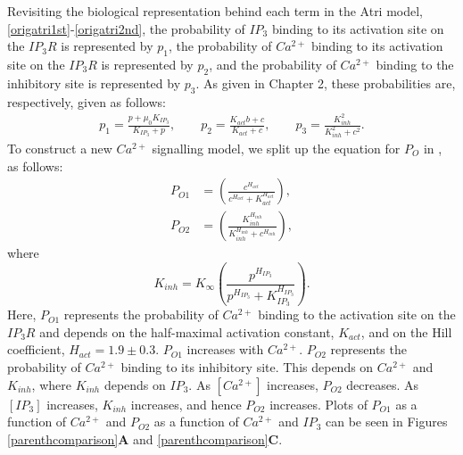 Revisiting the biological representation behind each term in the Atri model, \eqref{origatri1st}-\eqref{origatri2nd}, the probability of $IP_3$ binding to its activation site on the $IP_3R$ is represented by $p_1$, the probability of $Ca^{2+}$ binding to its activation site on the $IP_3R$ is represented by $p_2$, and the probability of $Ca^{2+}$ binding to the inhibitory site is represented by $p_3$. As given in Chapter 2, these probabilities are, respectively, given as follows:
\begin{align}
    p_1=\frac{p+\mu_0K_{IP_3}}{K_{IP_3}+p}, \qquad p_2=\frac{K_{act}b+c}{K_{act}+c}, \qquad p_3=\frac{K_{inh}^2}{K_{inh}^2+c^2}.\nonumber
\end{align}
To construct a new $Ca^{2+}$ signalling model, we split up the equation for $P_O$ in , as follows:
\begin{align}
    P_{O1}&={\left(\frac{c^{H_{act}}}{c^{H_{act}}+K_{act}^{H_{act}}}\right)},\nonumber\\
    P_{O2}&={\left(\frac{K_{inh}^{H_{inh}}}{K_{inh}^{H_{inh}}+c^{H_{inh}}}\right),}\nonumber
\end{align}
where
\begin{equation}\nonumber
    K_{inh}=K_{\infty}\left(\frac{p^{H_{IP_3}}}{p^{H_{IP_3}}+K_{IP_3}^{H_{IP_3}}}\right).
\end{equation}
Here, $P_{O1}$ represents the probability of $Ca^{2+}$ binding to the activation site on the $IP_3R$ and depends on the half-maximal activation constant, $K_{act}$, and on the Hill coefficient, $H_{act}=1.9 \pm 0.3$. $P_{O1}$ increases with $Ca^{2+}$. $P_{O2}$ represents the probability of $Ca^{2+}$ binding to its inhibitory site. This depends on $Ca^{2+}$ and $K_{inh}$, where $K_{inh}$ depends on $IP_3$. As $[Ca^{2+}]$ increases, $P_{O2}$ decreases. As $[IP_3]$ increases, $K_{inh}$ increases, and hence $P_{O2}$ increases. Plots of $P_{O1}$ as a function of $Ca^{2+}$ and $P_{O2}$ as a function of $Ca^{2+}$ and $IP_3$ can be seen in Figures \ref{parenthcomparison}\textbf{A} and \ref{parenthcomparison}\textbf{C}.

